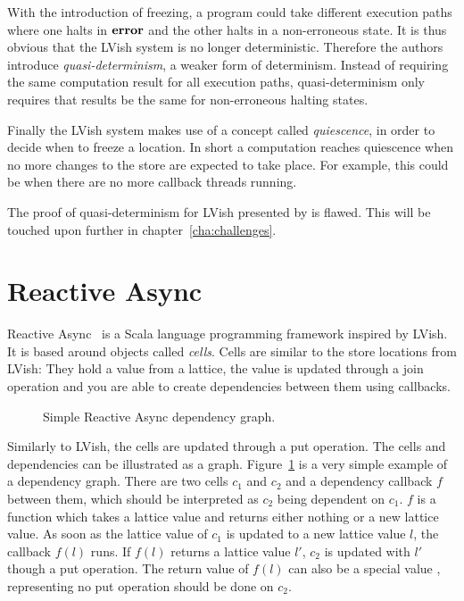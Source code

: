 With the introduction of freezing, a program could take different execution
paths where one halts in $\mbox{{\bf error}}$ and the other halts in a non-erroneous state.
It is thus obvious that the LVish system is no longer deterministic. Therefore
the authors introduce \emph{quasi-determinism}, a weaker form of
determinism. Instead of requiring the same computation result for all execution
paths, quasi-determinism only requires that results be the same for
non-erroneous halting states.

Finally the LVish system makes use of a concept called \emph{quiescence}, in
order to decide when to freeze a location. In short a computation reaches
quiescence when no more changes to the store are expected to take place. For
example, this could be when there are no more callback threads running.

The proof of quasi-determinism for LVish presented by
\textcite{kuper2014freezeTR} is flawed. This will be touched upon further in
chapter~\ref{cha:challenges}.


\section{Reactive Async}\label{sec:reactive_async}

Reactive Async~\parencite{conf/scala/HallerGES16} is a Scala language
programming framework inspired by LVish. It is based around objects called
\emph{cells}.  Cells are similar to the store locations from LVish: They hold a
value from a lattice, the value is updated through a join operation and you are
able to create dependencies between them using callbacks.

\begin{figure}
  \centering
  \caption{Simple Reactive Async dependency graph.}
  \label{fig:ra_example}
\end{figure}

Similarly to LVish, the cells are updated through a put operation.  The cells and
dependencies can be illustrated as a graph.  Figure~\ref{fig:ra_example} is a
very simple example of a dependency graph.  There are two cells $c_1$ and $c_2$
and a dependency callback $f$ between them, which should be interpreted as $c_2$
being dependent on $c_1$.  $f$ is a function which takes a lattice value and
returns either nothing or a new lattice value.  As soon as the lattice value of
$c_1$ is updated to a new lattice value $l$, the callback $f(l)$ runs. If $f(l)$
returns a lattice value $l'$, $c_2$ is updated with $l'$ though a put operation.
The return value of $f(l)$ can also be a special value ,
representing no put operation should be done on $c_2$.

